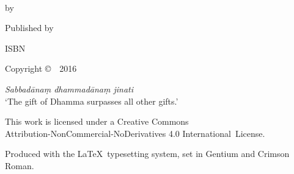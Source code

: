 \cleartoverso
\thispagestyle{empty}

{\copyrightsize
\centering
\setlength{\parindent}{0pt}%
\setlength{\parskip}{0.8\baselineskip}%

\thetitle\\
by \theauthor

Published by \thePublisher

ISBN \theISBN

Copyright \copyright\ \thePublisher\ 2016

\vfill

{\footnotesize

\textit{Sabbadānaṃ dhammadānaṃ jinati}\\
‘The gift of Dhamma surpasses all other gifts.’

This work is licensed under a Creative Commons\\
Attribution-NonCommercial-NoDerivatives 4.0 International~License.

Produced with the \LaTeX\ typesetting system, set in Gentium and Crimson Roman.

\theEditionInfo

}}
